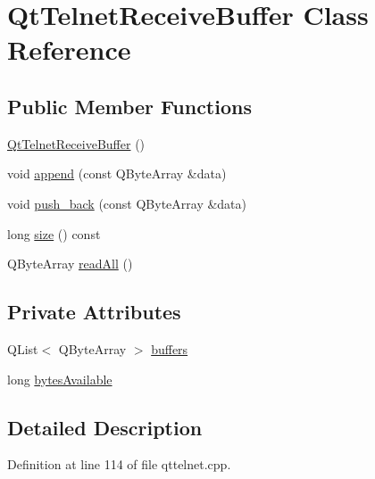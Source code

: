 \hypertarget{classQtTelnetReceiveBuffer}{
\section{QtTelnetReceiveBuffer Class Reference}
\label{classQtTelnetReceiveBuffer}
}
\subsection*{Public Member Functions}
\begin{DoxyCompactItemize}
\item 
\hyperlink{classQtTelnetReceiveBuffer_a3917e67c57e099710497c52b190363fc}{QtTelnetReceiveBuffer} ()
\item 
void \hyperlink{classQtTelnetReceiveBuffer_a18afe38b716bc9416699d66182fba241}{append} (const QByteArray \&data)
\item 
void \hyperlink{classQtTelnetReceiveBuffer_a24f819c851f7659918852fb0ec127093}{push\_\-back} (const QByteArray \&data)
\item 
long \hyperlink{classQtTelnetReceiveBuffer_a8d83127b574615ff6927073ef980b494}{size} () const 
\item 
QByteArray \hyperlink{classQtTelnetReceiveBuffer_a046baeae692234ac82b8e1cbd5aa630b}{readAll} ()
\end{DoxyCompactItemize}
\subsection*{Private Attributes}
\begin{DoxyCompactItemize}
\item 
QList$<$ QByteArray $>$ \hyperlink{classQtTelnetReceiveBuffer_a1b3ae3c81bfc75e232622906d19d9b3e}{buffers}
\item 
long \hyperlink{classQtTelnetReceiveBuffer_af9e8216d82fc5f1fc9a4aaff251b66bb}{bytesAvailable}
\end{DoxyCompactItemize}


\subsection{Detailed Description}


Definition at line 114 of file qttelnet.cpp.



